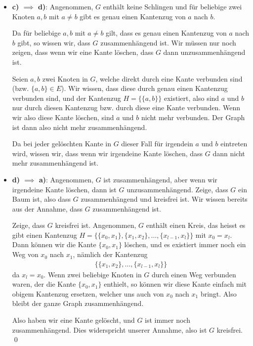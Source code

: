 \documentclass[12pt]{article}
\begin{document}
\begin{itemize}
    Dann bilden das Teilstück von $H_1$ von $u$ nach $w$ und das rückwärts durchlaufene Teilstück von $H_2$ von $w$ nach $u$ einen Kreis. Dies widerspricht der Annahme, dass $G$ kreisfrei ist. Also gibt es genau einen Kantenzug von $a$ nach $b$.

    Somit gilt die Implikation $b) \implies c)$.

    \item \textbf{c) $\implies$ d)}: Angenommen, $G$ enthält keine Schlingen und für beliebige zwei Knoten $a, b$ mit $a \neq b$ gibt es genau einen Kantenzug von $a$ nach $b$. 
    
    Da für beliebige $a, b$ mit $a \neq b$ gilt, dass es genau einen Kantenzug von $a$ nach $b$ gibt, so wissen wir, dass $G$ zusammenhängend ist. Wir müssen nur noch zeigen, dass wenn wir eine Kante löschen, dass $G$ dann unzusammenhängend ist.

    Seien $a, b$ zwei Knoten in $G$, welche direkt durch eine Kante verbunden sind (bzw. $\{a, b\} \in E$). Wir wissen, dass diese durch genau einen Kantenzug verbunden sind, und der Kantenzug $H = \{\{a, b\}\}$ existiert, also sind $a$ und $b$ nur durch diesen Kantenzug bzw. durch diese eine Kante verbunden. Wenn wir also diese Kante löschen, sind $a$ und $b$ nicht mehr verbunden. Der Graph ist dann also nicht mehr zusammenhängend. 
    
    Da bei jeder gelöschten Kante in $G$ dieser Fall für irgendein $a$ und $b$ eintreten wird, wissen wir, dass wenn wir irgendeine Kante löschen, dass $G$ dann nicht mehr zusammenhängend ist.

    \item \textbf{d) $\implies$ a)}: Angenommen, $G$ ist zusammenhängend, aber wenn wir irgendeine Kante löschen, dann ist $G$ unzusammenhängend. Zeige, dass $G$ ein Baum ist, also dass $G$ zusammenhängend und kreisfrei ist. Wir wissen bereits aus der Annahme, dass $G$ zusammenhängend ist.
    
    Zeige, dass $G$ kreisfrei ist. Angenommen, $G$ enthält einen Kreis, das heisst es gibt einen Kantenzug $H = \{\{x_0,x_1\},\{x_1,x_2\}, \dots, \{x_{l-1}, x_l\}\}$ mit $x_0 = x_l$. Dann können wir die Kante $\{x_0, x_1\}$ löschen, und es existiert immer noch ein Weg von $x_0$ nach $x_1$, nämlich der Kantenzug
    \begin{align*}
        \{\{x_1,x_2\}, \dots, \{x_{l-1}, x_l\}\}
    \end{align*}
    da $x_l = x_0$. Wenn zwei beliebige Knoten in $G$ durch einen Weg verbunden waren, der die Kante $\{x_0, x_1\}$ enthielt, so können wir diese Kante einfach mit obigem Kantenzug ersetzen, welcher uns auch von $x_0$ nach $x_1$ bringt. Also bleibt der ganze Graph zusammenhängend.
    
    Also haben wir eine Kante gelöscht, und $G$ ist immer noch zusammenhängend. Dies widerspricht unserer Annahme, also ist $G$ kreisfrei. \qed
\end{itemize}
\end{document}
